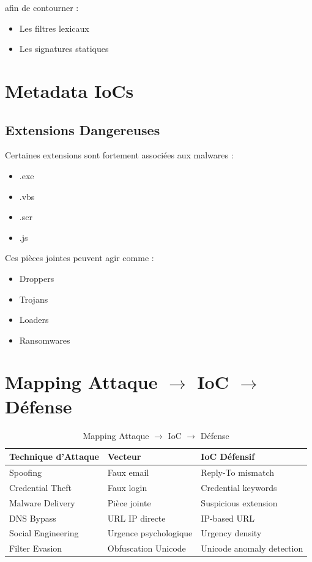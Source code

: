 \documentclass[12pt,a4paper]{article}
\begin{document}
afin de contourner :
\begin{itemize}
    \item Les filtres lexicaux
    \item Les signatures statiques
\end{itemize}

\section{Metadata IoCs}

\subsection{Extensions Dangereuses}

Certaines extensions sont fortement associées aux malwares :
\begin{itemize}
    \item .exe
    \item .vbs
    \item .scr
    \item .js
\end{itemize}

Ces pièces jointes peuvent agir comme :
\begin{itemize}
    \item Droppers
    \item Trojans
    \item Loaders
    \item Ransomwares
\end{itemize}

\section{Mapping Attaque $\rightarrow$ IoC $\rightarrow$ Défense}

\begin{table}[H]
\centering
\begin{tabular}{|p{4cm}|p{4cm}|p{4cm}|}
\hline
\textbf{Technique d'Attaque} & \textbf{Vecteur} & \textbf{IoC Défensif} \\
\hline
Spoofing & Faux email & Reply-To mismatch \\
\hline
Credential Theft & Faux login & Credential keywords \\
\hline
Malware Delivery & Pièce jointe & Suspicious extension \\
\hline
DNS Bypass & URL IP directe & IP-based URL \\
\hline
Social Engineering & Urgence psychologique & Urgency density \\
\hline
Filter Evasion & Obfuscation Unicode & Unicode anomaly detection \\
\hline
\end{tabular}
\caption{Mapping Attaque $\rightarrow$ IoC $\rightarrow$ Défense}
\end{table}
\end{document}
